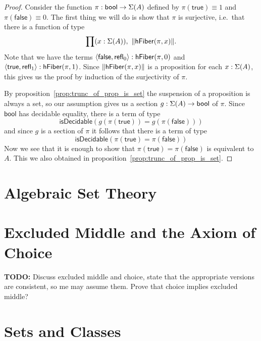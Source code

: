 \begin{proof}
Consider the function $\pi:\mathsf{bool}\to\Sigma(A)$ defined by 
$\pi(\mathsf{true})\equiv 1$ and $\pi(\mathsf{false})\equiv 0$. 
The first thing we will do is show that $\pi$ is surjective, 
i.e.\ that there is a function of type
\begin{equation*}
\prod(x:\Sigma(A)),\ \|\mathsf{hFiber}(\pi,x)\|.
\end{equation*}
Note that we have the terms 
$\langle{\mathsf{false},\ensuremath{\mathsf{refl}_{0}}}\rangle:\mathsf{hFiber}(\pi,0)$ 
and $\langle{\mathsf{true},\ensuremath{\mathsf{refl}_{1}}}\rangle:\mathsf{hFiber}(\pi,1)$. 
Since $\|\mathsf{hFiber}(\pi,x)\|$ is a proposition for each 
$x:\Sigma(A)$, this gives us the proof by induction of 
the surjectivity of $\pi$.

By proposition~\ref{prop:trunc_of_prop_is_set} the suspension of 
a proposition is always a set, so our assumption gives us a 
section $g:\Sigma(A)\to\mathsf{bool}$ of $\pi$. 
Since $\mathsf{bool}$ has decidable equality, there is a term of type 
\begin{equation*}
\mathsf{isDecidable}(g(\pi(\mathsf{true}))= g(\pi(\mathsf{false})))
\end{equation*}
and since $g$ is a section of $\pi$ it follows that there is a term of type
\begin{equation*}
\mathsf{isDecidable}(\pi(\mathsf{true})=\pi(\mathsf{false}))
\end{equation*}
Now we see that it is enough to show that 
$\pi(\mathsf{true})= \pi(\mathsf{false})$ is equivalent to $A$. 
This we also obtained in proposition~\ref{prop:trunc_of_prop_is_set}.
\end{proof}

\section{Algebraic Set Theory}


\section{Excluded Middle and the Axiom of Choice}
\label{sec:excl-middle-axiom}

\textbf{TODO:} Discuss excluded middle and choice, state that the appropriate versions are
consistent, so me may assume them. Prove that choice implies excluded middle?

\section{Sets and Classes}
\label{sec:sets-classes}


